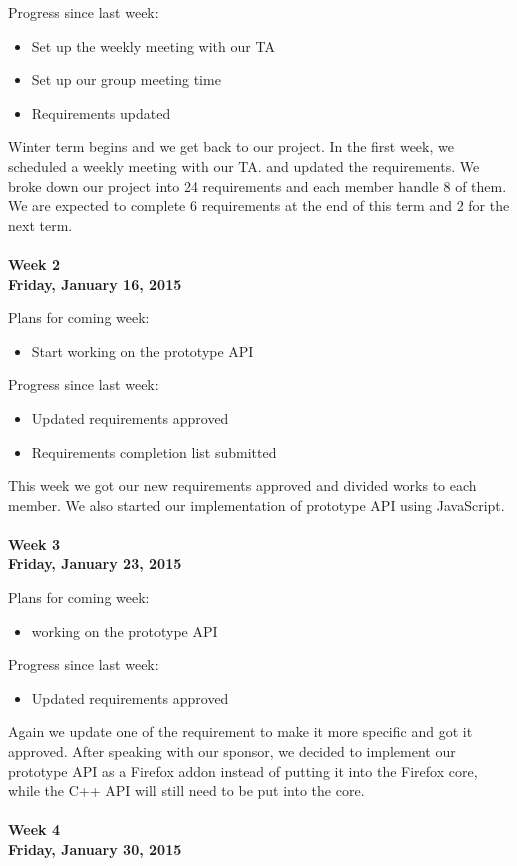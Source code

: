 \noindent Progress since last week:
\begin{itemize}
\item Set up the weekly meeting with our TA
\item Set up our group meeting time
\item Requirements updated
\end{itemize}

\noindent Winter term begins and we get back to our project. In the first week, we scheduled a weekly meeting with our TA. and updated the requirements. We broke down our project into 24 requirements and each member handle 8 of them. We are expected to complete 6 requirements at the end of this term and 2 for the next term. \\
\\
\textbf{Week 2\\Friday, January 16, 2015\\}

\noindent Plans for coming week:
\begin{itemize}
\item Start working on the prototype API
\end{itemize}

\noindent Progress since last week:
\begin{itemize}
\item Updated requirements approved
\item Requirements completion list submitted
\end{itemize}

\noindent This week we got our new requirements approved and divided works to each member. We also started our implementation of prototype API using JavaScript. \\
\\
\textbf{Week 3\\Friday, January 23, 2015\\}

\noindent Plans for coming week:
\begin{itemize}
\item working on the prototype API
\end{itemize}

\noindent Progress since last week:
\begin{itemize}
\item Updated requirements approved
\end{itemize}

\noindent Again we update one of the requirement to make it more specific and got it approved. After speaking with our sponsor, we decided to implement our prototype API as a Firefox addon instead of putting it into the Firefox core, while the  C++ API will still need to be put into the core. \\
\\
\textbf{Week 4\\Friday, January 30, 2015\\}

